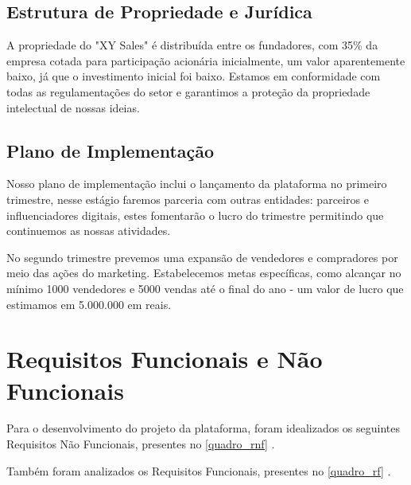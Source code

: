 \documentclass[
	12pt,				%
	openright,			%
	twoside,			%
	a4paper,			%
	english,			%
	brazil				%
	]{abntex2}
\begin{document}
\subsection{Estrutura de Propriedade e Jurídica}

A propriedade do "XY Sales" é distribuída entre os fundadores, com 35\%  da empresa cotada para participação acionária inicialmente, um valor aparentemente baixo, já que o investimento inicial foi baixo. Estamos em conformidade com todas as regulamentações do setor e garantimos a proteção da propriedade intelectual de nossas ideias.

\subsection{Plano de Implementação}

Nosso plano de implementação inclui o lançamento da plataforma no primeiro trimestre, nesse estágio faremos parceria com outras entidades: parceiros e influenciadores digitais, estes fomentarão o lucro do trimestre permitindo que continuemos as nossas atividades.

No segundo trimestre prevemos uma expansão de vendedores e compradores por meio das ações do marketing. Estabelecemos metas específicas, como alcançar no mínimo 1000 vendedores e 5000 vendas até o final do ano - um valor de lucro que estimamos em 5.000.000 em reais.

\section{Requisitos Funcionais e Não Funcionais}

Para o desenvolvimento do projeto da plataforma, foram idealizados os seguintes Requisitos Não Funcionais, presentes no \autoref{quadro_rnf} . 

Também foram analizados os Requisitos Funcionais, presentes no \autoref{quadro_rf} .
\end{document}
